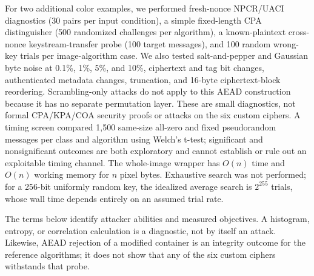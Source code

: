 \documentclass[letterpaper,journal]{IEEEtran}
\begin{document}
For two additional color examples, we performed fresh-nonce NPCR/UACI diagnostics (30 pairs per input condition), a simple fixed-length CPA distinguisher (500 randomized challenges per algorithm), a known-plaintext cross-nonce keystream-transfer probe (100 target messages), and 100 random wrong-key trials per image-algorithm case. We also tested salt-and-pepper and Gaussian byte noise at 0.1\%, 1\%, 5\%, and 10\%, ciphertext and tag bit changes, authenticated metadata changes, truncation, and 16-byte ciphertext-block reordering. Scrambling-only attacks do not apply to this AEAD construction because it has no separate permutation layer. These are small diagnostics, not formal CPA/KPA/COA security proofs or attacks on the six custom ciphers. A timing screen compared 1,500 same-size all-zero and fixed pseudorandom messages per class and algorithm using Welch's t-test; significant and nonsignificant outcomes are both exploratory and cannot establish or rule out an exploitable timing channel. The whole-image wrapper has $O(n)$ time and $O(n)$ working memory for $n$ pixel bytes. Exhaustive search was not performed; for a 256-bit uniformly random key, the idealized average search is $2^{255}$ trials, whose wall time depends entirely on an assumed trial rate.

The terms below identify attacker abilities and measured objectives. A histogram, entropy, or correlation calculation is a diagnostic, not by itself an attack. Likewise, AEAD rejection of a modified container is an integrity outcome for the reference algorithms; it does not show that any of the six custom ciphers withstands that probe.
\end{document}
